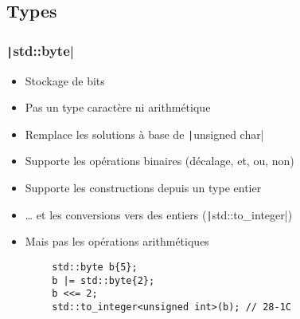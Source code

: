 \documentclass[C++.tex]{subfiles}
\begin{document}
\subsection*{Types}
\begin{frame}[fragile]
	\frametitle{\texttt|std::byte|}
	\begin{itemize}
		\item Stockage de bits
		\item Pas un type caractère ni arithmétique
		\item Remplace les solutions à base de \texttt|unsigned char|
		\item Supporte les opérations binaires (décalage, et, ou, non)
		\item Supporte les constructions depuis un type entier
		\item \ldots{} et les conversions vers des entiers (\texttt|std::to_integer|)
		\item Mais pas les opérations arithmétiques
	\end{itemize}

	\begin{verbatim}
		std::byte b{5};
		b |= std::byte{2};
		b <<= 2;
		std::to_integer<unsigned int>(b); // 28-1C
	\end{verbatim}


\end{frame}
\end{document}
